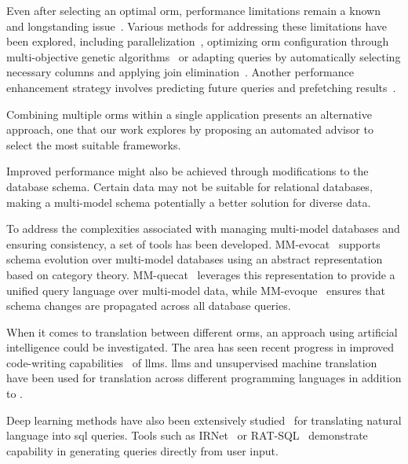 Even after selecting an optimal \acrshort{orm}, performance limitations remain a known and longstanding issue~\cite{survey_hule_ranawat_2023}. Various methods for addressing these limitations have been explored, including parallelization~\cite{orm_parallel}, optimizing \acrshort{orm} configuration through multi-objective genetic algorithms~\cite{orm_configuration_optimization} or adapting queries by automatically selecting necessary columns and applying join elimination~\cite{quartarone2020adaptive}. Another performance enhancement strategy involves predicting future queries and prefetching results~\cite{prefetching}.

Combining multiple \acrshort{orm}s within a single application presents an alternative approach, one that our work explores by proposing an automated advisor to select the most suitable frameworks. 

Improved performance might also be achieved through modifications to the database schema. Certain data may not be suitable for relational databases, making a multi-model schema potentially a better solution for diverse data. 

To address the complexities associated with managing multi-model databases and ensuring consistency, a set of tools has been developed. MM-evocat~\cite{mm_evocat} supports schema evolution over multi-model databases using an abstract representation based on category theory. MM-quecat~\cite{mm_quecat} leverages this representation to provide a unified query language over multi-model data, while MM-evoque~\cite{mm_evoque} ensures that schema changes are propagated across all database queries. 

When it comes to translation between different \acrshort{orm}s, an approach using artificial intelligence could be investigated. The area has seen recent progress in improved code-writing capabilities~\cite{evaluatingllms} of \acrlong{llm}s. \acrshort{llm}s\cite{transagentllm} and unsupervised machine translation~\cite{translation_unsupervised} have been used for translation across different programming languages in addition to .

Deep learning methods have also been extensively studied~\cite{text-to-sql-survey} for translating natural language into \acrshort{sql} queries. Tools such as IRNet~\cite{text-to-sql-irnet} or RAT-SQL~\cite{text-to-sql-rat} demonstrate capability in generating queries directly from user input.


